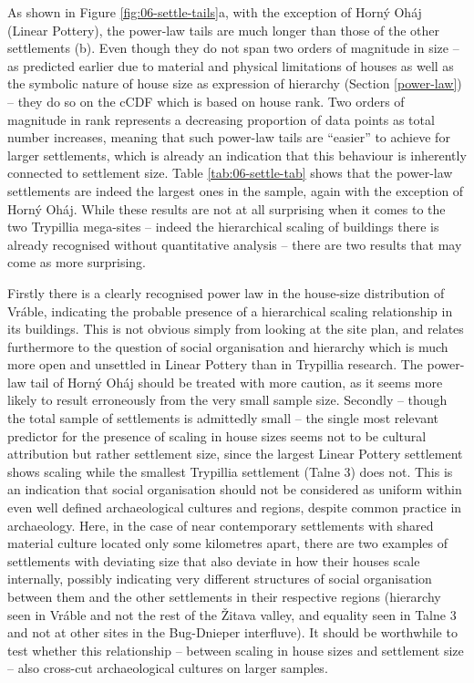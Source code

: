 \documentclass[
  12pt,
]{book}
\begin{document}
As shown in Figure \ref{fig:06-settle-tails}a, with the exception of Horný Oháj (Linear Pottery), the power-law tails are much longer than those of the other settlements (b). Even though they do not span two orders of magnitude in size -- as predicted earlier due to material and physical limitations of houses as well as the symbolic nature of house size as expression of hierarchy (Section \ref{power-law}) -- they do so on the cCDF which is based on house rank. Two orders of magnitude in rank represents a decreasing proportion of data points as total number increases, meaning that such power-law tails are ``easier'' to achieve for larger settlements, which is already an indication that this behaviour is inherently connected to settlement size. Table \ref{tab:06-settle-tab} shows that the power-law settlements are indeed the largest ones in the sample, again with the exception of Horný Oháj. While these results are not at all surprising when it comes to the two Trypillia mega-sites -- indeed the hierarchical scaling of buildings there is already recognised without quantitative analysis -- there are two results that may come as more surprising.

Firstly there is a clearly recognised power law in the house-size distribution of Vráble, indicating the probable presence of a hierarchical scaling relationship in its buildings. This is not obvious simply from looking at the site plan, and relates furthermore to the question of social organisation and hierarchy which is much more open and unsettled in Linear Pottery than in Trypillia research. The power-law tail of Horný Oháj should be treated with more caution, as it seems more likely to result erroneously from the very small sample size. Secondly -- though the total sample of settlements is admittedly small -- the single most relevant predictor for the presence of scaling in house sizes seems not to be cultural attribution but rather settlement size, since the largest Linear Pottery settlement shows scaling while the smallest Trypillia settlement (Talne 3) does not. This is an indication that social organisation should not be considered as uniform within even well defined archaeological cultures and regions, despite common practice in archaeology. Here, in the case of near contemporary settlements with shared material culture located only some kilometres apart, there are two examples of settlements with deviating size that also deviate in how their houses scale internally, possibly indicating very different structures of social organisation between them and the other settlements in their respective regions (hierarchy seen in Vráble and not the rest of the Žitava valley, and equality seen in Talne 3 and not at other sites in the Bug-Dnieper interfluve). It should be worthwhile to test whether this relationship -- between scaling in house sizes and settlement size -- also cross-cut archaeological cultures on larger samples.
\end{document}
